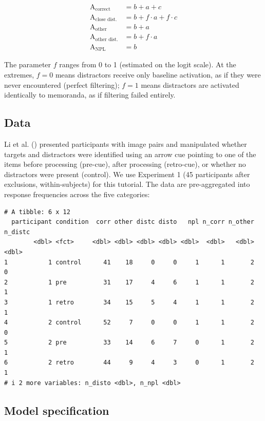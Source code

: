 \documentclass[
  man,
  floatsintext,
  longtable,
  nolmodern,
  notxfonts,
  notimes,
  colorlinks=true,linkcolor=blue,citecolor=blue,urlcolor=blue]{apa7}
\begin{document}
\[
\begin{aligned}
\text{A}_{\text{correct}} &= b + a + c \\
\text{A}_{\text{close dist.}} &= b + f \cdot a + f \cdot c \\
\text{A}_{\text{other}} &= b + a \\
\text{A}_{\text{other dist.}} &= b + f \cdot a \\
\text{A}_{\text{NPL}} &= b
\end{aligned}
\]

The parameter \(f\) ranges from 0 to 1 (estimated on the logit scale).
At the extremes, \(f = 0\) means distractors receive only baseline
activation, as if they were never encountered (perfect filtering);
\(f = 1\) means distractors are activated identically to memoranda, as
if filtering failed entirely.

\subsection{Data}\label{data-1}

Li et al. () presented participants
with image pairs and manipulated whether targets and distractors were
identified using an arrow cue pointing to one of the items before
processing (pre-cue), after processing (retro-cue), or whether no
distractors were present (control). We use Experiment 1 (45 participants
after exclusions, within-subjects) for this tutorial. The data are
pre-aggregated into response frequencies across the five categories:

\begin{verbatim}
# A tibble: 6 x 12
  participant condition  corr other distc disto   npl n_corr n_other n_distc
        <dbl> <fct>     <dbl> <dbl> <dbl> <dbl> <dbl>  <dbl>   <dbl>   <dbl>
1           1 control      41    18     0     0     1      1       2       0
2           1 pre          31    17     4     6     1      1       2       1
3           1 retro        34    15     5     4     1      1       2       1
4           2 control      52     7     0     0     1      1       2       0
5           2 pre          33    14     6     7     0      1       2       1
6           2 retro        44     9     4     3     0      1       2       1
# i 2 more variables: n_disto <dbl>, n_npl <dbl>
\end{verbatim}

\subsection{Model specification}\label{model-specification-1}
\end{document}
